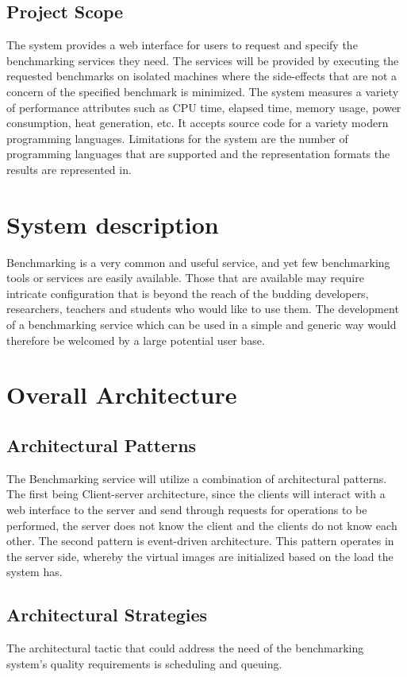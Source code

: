 \documentclass[runningheads,a4paper]{article}
\begin{document}
\subsection{Project Scope}
The system provides a web interface for users to request and specify the benchmarking services they need. The services will be provided by executing the requested benchmarks on isolated machines where the side-effects that are not a concern of the specified benchmark is minimized. The system measures a variety of performance attributes such as CPU time, elapsed time, memory usage, power consumption, heat generation, etc. It accepts source code for a variety modern programming languages. Limitations for the system are the number of programming languages that are supported and the representation formats the results are represented in.


\section{System description}
Benchmarking is a very common and useful service, and yet few benchmarking tools or services are easily available. Those that are available may require intricate configuration that is beyond the reach of the budding developers, researchers, teachers and students who would like to use them. The development of a benchmarking service which can be used in a simple and generic way would therefore be welcomed by a large potential user base.

\section{Overall Architecture}
\subsection{Architectural Patterns}
The Benchmarking service will utilize a combination of architectural patterns. The first being Client-server architecture, since the clients will interact with a web interface to the server and send through requests for operations to be performed, the server does not know the client and the clients do not know each other. The second pattern is event-driven architecture. This pattern operates in the server side, whereby the virtual images are initialized based on the load the system has.\\

\subsection{Architectural Strategies}
The architectural tactic that could address the need of the benchmarking system's quality requirements is scheduling and queuing.
\end{document}
